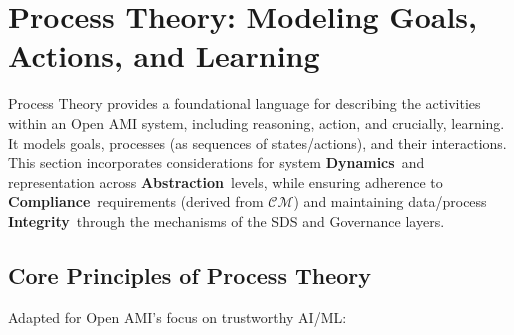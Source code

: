 \documentclass[12pt,a4paper]{report}
\newcommand{\Compliance}{\textbf{Compliance}}
\newcommand{\Integrity}{\textbf{Integrity}}
\newcommand{\Abstraction}{\textbf{Abstraction}}
\newcommand{\Dynamics}{\textbf{Dynamics}}
\begin{document}
	\section{Process Theory: Modeling Goals, Actions, and Learning}
	\label{sec:2-2}
	
	Process Theory provides a foundational language for describing the activities within an Open AMI system, including reasoning, action, and crucially, learning. It models goals, processes (as sequences of states/actions), and their interactions. This section incorporates considerations for system \Dynamics\ and representation across \Abstraction\ levels, while ensuring adherence to \Compliance\ requirements (derived from $\mathcal{CM}$) and maintaining data/process \Integrity\ through the mechanisms of the SDS and Governance layers.
	
	\subsection{Core Principles of Process Theory}
	\label{sec:2-2-1}
	
	Adapted for Open AMI's focus on trustworthy AI/ML:
	
\end{document}

